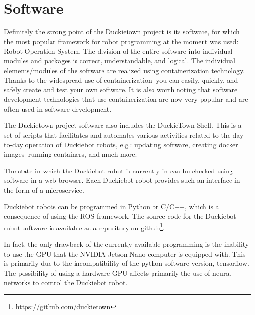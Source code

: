\documentclass[conference]{IEEEtran}
\begin{document}
\section{Software}\label{sec:software}
Definitely the strong point of the Duckietown project is its software, for which the most popular framework for robot programming at the moment was used: Robot Operation System. 
The division of the entire software into individual modules and packages is correct, understandable, and logical. 
The individual elements/modules of the software are realized using containerization technology. Thanks to the widespread use of containerization, you can easily, quickly, and safely create and test your own software. It is also worth noting that software development technologies that use containerization are now very popular and are often used in software development.  

The Duckietown project software also includes the DuckieTown Shell. This is a set of scripts that facilitates and automates various activities related to the day-to-day operation of Duckiebot robots, e.g.: updating software, creating docker images, running containers, and much more.

The state in which the Duckiebot robot is currently in can be checked using software in a web browser. Each Duckiebot robot provides such an interface in the form of a microservice.

Duckiebot robots can be programmed in Python or C/C++, which is a consequence of using the ROS framework. The source code for the Duckiebot robot software is available as a repository on github\footnote{https://github.com/duckietown}.

In fact, the only drawback of the currently available programming is the inability to use the GPU that the NVIDIA Jetson Nano computer is equipped with. This is primarily due to the incompatibility of the python software version, tensorflow. The possibility of using a hardware GPU affects primarily the use of neural networks to control the Duckiebot robot.
\end{document}
